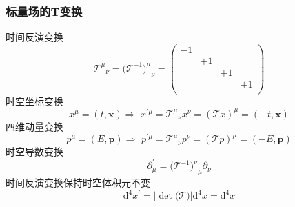 \subsubsection{标量场的T变换}

时间反演变换
\begin{equation}
    {\mathcal{T} ^{\mu}}_{\nu}=(\mathcal{T} ^{-1}{)^{\mu}}_{\nu}=\left( \begin{matrix}
	-1&		&		&		\\
	&		+1&		&		\\
	&		&		+1&		\\
	&		&		&		+1\\
\end{matrix} \right) 
\end{equation}
时空坐标变换
\begin{equation}
    x^{\mu}=\left( t,\mathbf{x} \right) \Rightarrow \,\,x^{\prime \mu}={\mathcal{T} ^{\mu}}_{\nu}x^{\nu}=(\mathcal{T} x)^{\mu}=\left( -t,\mathbf{x} \right) 
\end{equation}
四维动量变换
\begin{equation}
    p^{\mu}=\left( E,\mathbf{p} \right) \Rightarrow \,\,p^{\prime \mu}={\mathcal{T} ^{\mu}}_{\nu}p^{\nu}=(\mathcal{T} p)^{\mu}=\left( -E,\mathbf{p} \right) 
\end{equation}
时空导数变换
\begin{equation}
    \partial _{\mu}^{\prime}=(\mathcal{T} ^{-1}{)^{\nu}}_{\mu}\partial _{\nu}
\end{equation}
时间反演变换保持时空体积元不变
\begin{equation}
    \mathrm{d}^4x^{\prime}=\left| \det\mathrm{(}\mathcal{T} ) \right|\mathrm{d}^4x=\mathrm{d}^4x
\end{equation}


